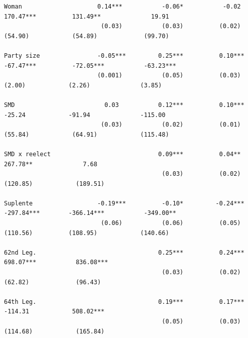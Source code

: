 \documentclass[letter,12pt]{article}
\begin{document}
\begin{table}
\begin{tiny}
\begin{verbatim}
Woman                     0.14***           -0.06*           -0.02         170.47***          131.49**              19.91     
                           (0.03)           (0.03)          (0.02)          (54.90)            (54.89)             (99.70)    
                                                                                                                              
Party size                -0.05***         0.25***          0.10***        -67.47***          -72.05***           -63.23***   
                          (0.001)           (0.05)          (0.03)           (2.00)            (2.26)              (3.85)     
                                                                                                                              
SMD                         0.03           0.12***          0.10***          -25.24            -91.94              -115.00    
                           (0.03)           (0.02)          (0.01)          (55.84)            (64.91)            (115.48)    
                                                                                                                              
SMD x reelect                              0.09***          0.04**                            267.78**              7.68      
                                            (0.03)          (0.02)                            (120.85)            (189.51)    
                                                                                                                              
Suplente                  -0.19***          -0.10*         -0.24***        -297.84***        -366.14***           -349.00**   
                           (0.06)           (0.06)          (0.05)          (110.56)          (108.95)            (140.66)    
                                                                                                                              
62nd Leg.                                  0.25***          0.24***                           698.07***           836.08***   
                                            (0.03)          (0.02)                             (62.82)             (96.43)    
                                                                                                                              
64th Leg.                                  0.19***          0.17***                            -114.31            508.02***   
                                            (0.05)          (0.03)                            (114.68)            (165.84)    
                                                                                                                              

\end{verbatim}
\end{tiny}
\end{table}
\end{document}
